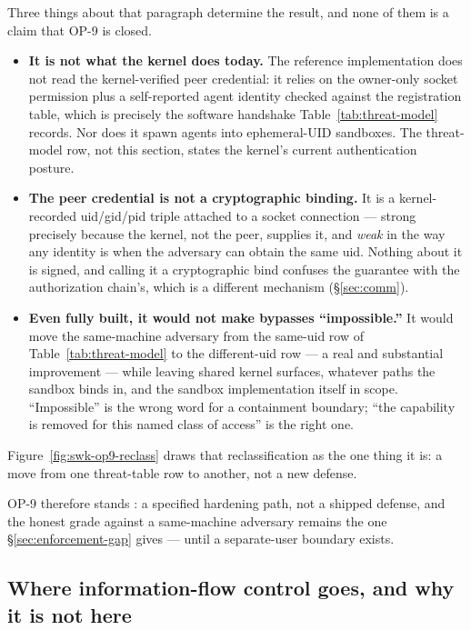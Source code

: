 \documentclass[11pt,a4paper]{article}
\theoremstyle{definition}
\theoremstyle{remark}
\begin{document}
Three things about that paragraph determine the result, and none of them is a claim that
OP-9 is closed.

\begin{itemize}[leftmargin=1.4em,itemsep=2pt]
  \item \textbf{It is not what the kernel does today.} The reference implementation
  does not read the kernel-verified peer credential: it relies on the owner-only
  socket permission plus a self-reported agent identity checked against the
  registration table, which is precisely the software handshake
  Table~\ref{tab:threat-model} records. Nor does it spawn agents into ephemeral-UID
  sandboxes. The threat-model row, not this section, states the kernel's current
  authentication posture.
  \item \textbf{The peer credential is not a cryptographic binding.} It is a
  kernel-recorded uid/gid/pid triple attached to a socket connection --- strong
  precisely because the kernel, not the peer, supplies it, and \emph{weak} in the
  way any identity is when the adversary can obtain the same uid. Nothing about it
  is signed, and calling it a cryptographic bind confuses the guarantee with the
  authorization chain's, which is a different mechanism (\S\ref{sec:comm}).
  \item \textbf{Even fully built, it would not make bypasses ``impossible.''} It
  would move the same-machine adversary from the same-uid row of
  Table~\ref{tab:threat-model} to the different-uid row --- a real and substantial
  improvement --- while leaving shared kernel surfaces, whatever paths the sandbox
  binds in, and the sandbox implementation itself in scope. ``Impossible'' is the
  wrong word for a containment boundary; ``the capability is removed for this
  named class of access'' is the right one.
\end{itemize}



Figure~\ref{fig:swk-op9-reclass} draws that reclassification as the one thing it
is: a move from one threat-table row to another, not a new defense.

\noindent OP-9 therefore stands \Open{}: a specified hardening path, not a shipped
defense, and the honest grade against a same-machine adversary remains the one
\S\ref{sec:enforcement-gap} gives --- \NotGuar{} until a separate-user boundary
exists.

\subsection{Where information-flow control goes, and why it is not here}
\label{sec:ifc-airlock}
\end{document}
